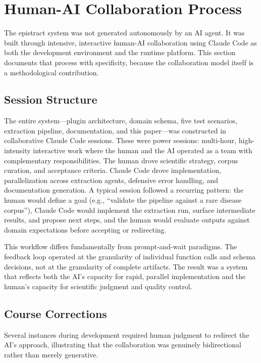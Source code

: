 \section{Human-AI Collaboration Process}

The epistract system was not generated autonomously by an AI agent. It was built through intensive, interactive human-AI collaboration using Claude Code as both the development environment and the runtime platform. This section documents that process with specificity, because the collaboration model itself is a methodological contribution.

\subsection{Session Structure}

The entire system---plugin architecture, domain schema, five test scenarios, extraction pipeline, documentation, and this paper---was constructed in collaborative Claude Code sessions. These were power sessions: multi-hour, high-intensity interactive work where the human and the AI operated as a team with complementary responsibilities. The human drove scientific strategy, corpus curation, and acceptance criteria. Claude Code drove implementation, parallelization across extraction agents, defensive error handling, and documentation generation. A typical session followed a recurring pattern: the human would define a goal (e.g., ``validate the pipeline against a rare disease corpus''), Claude Code would implement the extraction run, surface intermediate results, and propose next steps, and the human would evaluate outputs against domain expectations before accepting or redirecting.

This workflow differs fundamentally from prompt-and-wait paradigms. The feedback loop operated at the granularity of individual function calls and schema decisions, not at the granularity of complete artifacts. The result was a system that reflects both the AI's capacity for rapid, parallel implementation and the human's capacity for scientific judgment and quality control.

\subsection{Course Corrections}

Several instances during development required human judgment to redirect the AI's approach, illustrating that the collaboration was genuinely bidirectional rather than merely generative.

